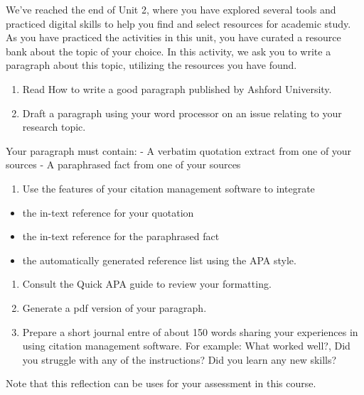 \documentclass[
]{book}
\providecommand{\tightlist}{%
  \setlength{\itemsep}{0pt}\setlength{\parskip}{0pt}}
\theoremstyle{definition}
\theoremstyle{definition}
\theoremstyle{definition}
\theoremstyle{definition}
\theoremstyle{remark}
\begin{document}
\begin{reflect}
We've reached the end of Unit 2, where you have explored several tools and practiced digital skills to help you find and select resources for academic study. As you have practiced the activities in this unit, you have curated a resource bank about the topic of your choice. In this activity, we ask you to write a paragraph about this topic, utilizing the resources you have found.

\begin{enumerate}
\def\labelenumi{\arabic{enumi}.}
\tightlist
\item
  Read How to write a good paragraph published by Ashford University.
\item
  Draft a paragraph using your word processor on an issue relating to your research topic.
\end{enumerate}

Your paragraph must contain:
- A verbatim quotation extract from one of your sources
- A paraphrased fact from one of your sources

\begin{enumerate}
\def\labelenumi{\arabic{enumi}.}
\setcounter{enumi}{2}
\tightlist
\item
  Use the features of your citation management software to integrate
\end{enumerate}

\begin{itemize}
\tightlist
\item
  the in-text reference for your quotation
\item
  the in-text reference for the paraphrased fact
\item
  the automatically generated reference list using the APA style.
\end{itemize}

\begin{enumerate}
\def\labelenumi{\arabic{enumi}.}
\setcounter{enumi}{3}
\tightlist
\item
  Consult the Quick APA guide to review your formatting.
\item
  Generate a pdf version of your paragraph.
\item
  Prepare a short journal entre of about 150 words sharing your experiences in using citation management software. For example: What worked well?, Did you struggle with any of the instructions? Did you learn any new skills?
\end{enumerate}

Note that this reflection can be uses for your assessment in this course.
\end{reflect}
\end{document}
